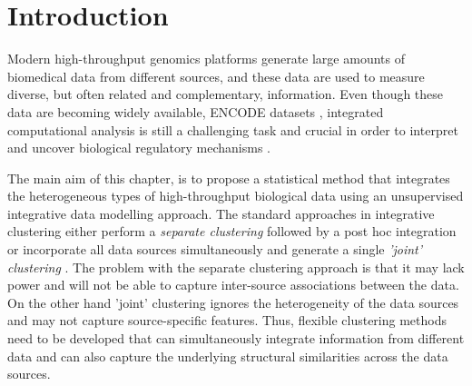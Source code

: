 \section{Introduction} \label{integr-intro-sect}
Modern high-throughput genomics platforms generate large amounts of biomedical data from different sources, and these data are used to measure diverse, but often related and complementary, information. Even though these data are becoming widely available, \eg ENCODE datasets \citep{Dunham2012}, integrated computational analysis is still a challenging task and crucial in order to interpret and uncover biological regulatory mechanisms \citep{Park2009}.   

The main aim of this chapter, is to propose a statistical method that integrates the heterogeneous types of high-throughput biological data using an unsupervised integrative data modelling approach. The standard approaches in integrative clustering either perform a \emph{separate clustering} followed by a post hoc integration \citep{Wang2011} or incorporate all data sources simultaneously and generate a single \emph{'joint' clustering} \citep{Kormaksson2012, Mo2013}. The problem with the separate clustering approach is that it may lack power and will not be able to capture inter-source associations between the data. On the other hand 'joint' clustering ignores the heterogeneity of the data sources and may not capture source-specific features. Thus, flexible clustering methods need to be developed that can simultaneously integrate information from different data and can also capture the underlying structural similarities across the data sources.